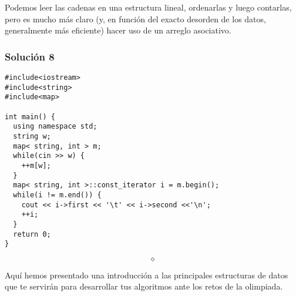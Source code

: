 \documentclass[10pt,letterpaper,twocolumn,spanish]{article}
\begin{document}
Podemos leer las cadenas en una estructura lineal, ordenarlas y luego contarlas, pero es mucho más claro (y, en función del exacto desorden de los datos, generalmente más eficiente) hacer uso de un arreglo asociativo.

\subsubsection*{Solución 8}

\begin{verbatim}
#include<iostream>
#include<string>
#include<map>

int main() {
  using namespace std;
  string w;
  map< string, int > m;
  while(cin >> w) {
    ++m[w];
  }
  map< string, int >::const_iterator i = m.begin();
  while(i != m.end()) {
    cout << i->first << '\t' << i->second <<'\n';
    ++i;
  }
  return 0;
}
\end{verbatim}

\[\diamond\]

Aquí hemos presentado una introducción a las principales estructuras de datos que te servirán para desarrollar tus algoritmos ante los retos de la olimpiada.
\end{document}
